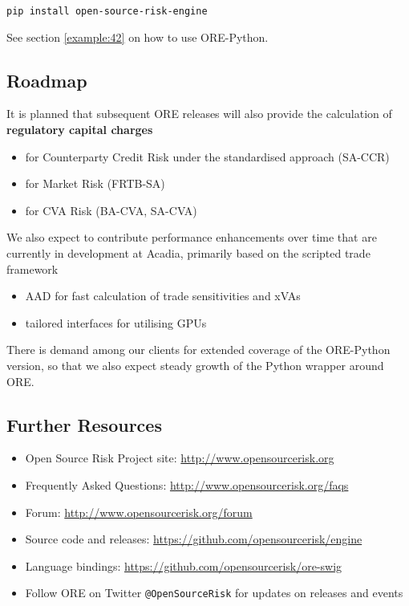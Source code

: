 \documentclass[12pt, a4paper]{article}
\begin{document}
\medskip
\centerline{\tt pip install open-source-risk-engine}
 
\medskip
See section \ref{example:42} on how to use ORE-Python. 

\subsection{Roadmap}

It is planned that subsequent ORE releases will also provide the calculation of {\bf regulatory capital charges} 
\begin{itemize}
\item for Counterparty Credit Risk under the standardised approach (SA-CCR)
\item for Market Risk (FRTB-SA)
\item for CVA Risk (BA-CVA, SA-CVA)
\end{itemize}

We also expect to contribute performance enhancements over time that are currently in development at Acadia, primarily based on the scripted trade framework
\begin{itemize}
\item AAD for fast calculation of trade sensitivities and xVAs
\item tailored interfaces for utilising GPUs
\end{itemize}

There is demand among our clients for extended coverage of the ORE-Python version, so that we also expect steady growth of the Python wrapper around ORE.

\subsection{Further Resources}
\begin{itemize}
\item Open Source Risk Project site: \url{http://www.opensourcerisk.org}
\item Frequently Asked Questions: \url{http://www.opensourcerisk.org/faqs}
\item Forum: \url{http://www.opensourcerisk.org/forum}
\item Source code and releases: \url{https://github.com/opensourcerisk/engine}
\item Language bindings: \url{https://github.com/opensourcerisk/ore-swig}
\item Follow ORE on Twitter {\tt @OpenSourceRisk} for updates on releases and events
\end{itemize}
 
\end{document}
